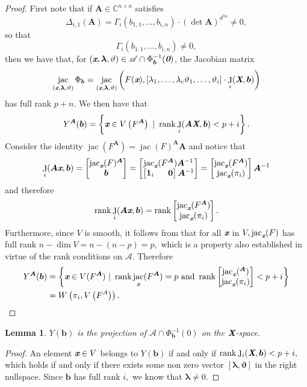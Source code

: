 \documentclass[a4paper]{article}
\def\sA{\mathscr{A}}
\def\bz{\textit{\textbf{0}}}
\def\Xb{\textit{\textbf{X}}}
\def\mA{{\bm A}}
\def\xb{\textit{\textbf{x}}}
\def\vt{\vartheta}
\DeclareMathOperator{\J}{J}
\DeclareMathOperator{\jac}{jac}
\DeclareMathOperator{\rk}{rank}
\def\C{\mathbb{C}}
\def\bbm{\begin{bmatrix}}
\def\ebm{\end{bmatrix}}
\def\gi{\Gamma_i}
\newtheorem{lemma}[theorem]{Lemma}
\begin{document}
    \begin{proof}
    First note that if $\bm A \in \C^{n \times n}$ satisfies
    \[
    \Delta_{i,1}(\bm A) = \Gamma_i(b_{1,1},\hdots,b_{i,n})\cdot (\det \bm A)^{d^{5n}}\not = 0, 
    \]
    so that
    \[        
    \gi(b_{1,1},\hdots,b_{i,n}) \not = 0,
    \]
    then we have that, for $(\xb, \bm \lambda, \vt) \in \sA \cap \Phi^{-1}_{\bm b}(\bz)$, the Jacobian matrix 
    \[
    \jac_{(\xb, \bm \lambda, \vt)}\Phi_{\bm b} 
    = \jac_{(\xb, \bm \lambda, \vt)}\left(F(\xb),[\lambda_1, \hdots, \lambda_c \vt_1, \hdots, \vt_i ] \cdot 
   \J_i(\Xb,\bm b)
    \right)
    \]
    has full rank $p + n$. We then have that
    \[
    Y^{\mA}(\bm b) = \left\{\xb \in V\left(F^{\mA}\right)~
    |~\rk     
\J_i(\mA \Xb,\bm b)
     < p+i\right\}.
    \]
    Consider the identity $\jac(F^{\mA}) = \jac(F)^{\mA}\mA$ and notice that
    \[
    \J_i(\mA\xb,\bm b)
    =
    \bbm 
    \jac_{\xb}(F)^\mA\\
    \bm b
     \ebm
     =
    \bbm 
    \jac_{\xb}(F^\mA)\mA^{-1}\\
    \bbm
    \bm 1_i ~~~~~ \bm 0
    \ebm\mA^{-1} 
     \ebm
     =
     \bbm 
    \jac_{\xb}(F^\mA)\\
    \jac_{\xb}(\pi_i)
     \ebm
    \mA^{-1}
    \]
    and therefore 
    \[
    \rk \J_i(\mA\xb,\bm b)
    =
    \rk
     \bbm 
    \jac_{\xb}(F^\mA)\\
    \jac_{\xb}(\pi_i)
     \ebm.
    \]
    Furthermore, since $V$ is smooth, it follows from \cite[Corollary 16.20]{ECA} that for all $\xb$ in $V, \jac_{\xb}(F)$ has full rank $n - \dim V = n -(n-p) = p ,$ which is a property also established in virtue of the rank conditions on $\sA.$
    Therefore 
    \begin{align*}
     Y^{\mA}(\bm b) &= \left\{\xb \in V(F^{\mA})~
    |~\rk \jac_{\xb}(F^{\mA})=p
    \textrm{ and }
    \rk     
    \bbm 
    \jac_{\xb}(^{\mA})\\
    \jac_{\xb}(\pi_i)
     \ebm
     < p+i\right\} \\
     &= W\left(\pi_i,V\left(F^A\right)\right). 
    \end{align*}
    \end{proof}
    \begin{lemma}
    $Y(\bm b)$ is the projection of $\sA \cap \Phi^{-1}_{\bm b}(0)$ on the $\Xb$-space.
    \end{lemma}
    \begin{proof}
    An element $\xb \in V$ belongs to $Y(\bm b)$ if and only if $\rk     
    \J_i(\Xb,\bm b)
    < p + i,$
    which holds if and only if there exists some non zero vector $[\bm \lambda, \bm \vt]$ in the right nullspace. Since $\bm b$ has full rank $i,$ we know that $\bm \lambda \not = 0$.
    \end{proof}
\end{document}
